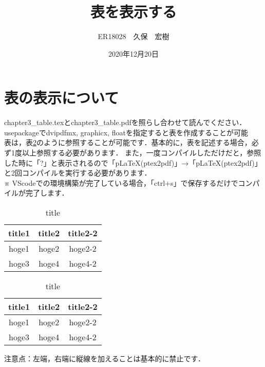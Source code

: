 \documentclass[a4paper,10pt]{jsarticle}
\title{表を表示する}%
\author{ER18028　久保　宏樹}%
\date{2020年12月20日}%
\begin{document}
\maketitle%
\section{表の表示について}
chapter3\_table.texとchapter3\_table.pdfを照らし合わせて読んでください．\\

usepackageでdvipdfmx, graphicx, floatを指定すると表を作成することが可能\\

表は，表\ref{tb:label}のように参照することが可能です．基本的に，表を記述する場合，必ず1度以上参照する必要があります．
また，一度コンパイルしただけだと，参照した時に「?」と表示されるので「pLaTeX(ptex2pdf)」→「pLaTeX(ptex2pdf)」と2回コンパイルを実行する必要があります．\\
※ VScodeでの環境構築が完了している場合，「ctrl+s」で保存するだけでコンパイルが完了します．
\begin{table}[H]
    \caption{title}
    \label{tb:label}                 
    \centering                     
    \begin{tabular}{c | c  c}
        \hline                        
        title1 & title2 & title2-2 \\          
        \hline \hline
        hoge1 & hoge2 & hoge2-2 \\
        hoge3 & hoge4 & hoge4-2 \\
        \hline
    \end{tabular}
\end{table}

\begin{table}[H]
    \caption{title}
    \label{tb:label}                 
    \centering                     
    \begin{tabular}{c | c  c}
        \hline                        
        title1 & title2 & title2-2 \\          
        \hline \hline
        hoge1 & hoge2 & hoge2-2 \\
        hoge3 & hoge4 & hoge4-2 \\
        \hline
    \end{tabular}
\end{table}
注意点：左端，右端に縦線を加えることは基本的に禁止です．
\end{document}
